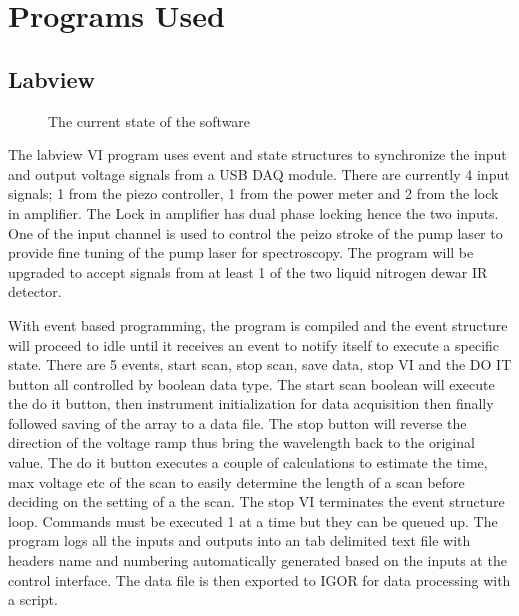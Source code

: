 \documentclass[11pt,a4paper]{book}
\newcommand{\imginput}[1]{} %
\begin{document}
	\section{Programs Used}
		\subsection{Labview}

		\begin{figure} [!ht]
			\centering
			\resizebox{160mm}{!}{\imginput{images/labview-program.pdf_tex}}
			\caption{The current state of the software}
			\label{fig:labview-program}
		\end{figure}

		The labview VI program uses event and state structures to synchronize the input and output voltage signals from a USB DAQ module. There are currently 4 input signals; 1 from the piezo controller, 1 from the power meter and 2 from the lock in amplifier. The Lock in amplifier has dual phase locking hence the two inputs. One of the input channel is used to control the peizo stroke of the pump laser to provide fine tuning of the pump laser for spectroscopy. The program will be upgraded to accept signals from at least 1 of the two liquid nitrogen dewar IR detector. 
		
		With event based programming, the program is compiled and the event structure will proceed to idle until it receives an event to notify itself to execute a specific state. There are 5 events, start scan, stop scan, save data, stop VI and the DO IT button all controlled by boolean data type. The start scan boolean will execute the do it button, then instrument initialization for data acquisition then finally followed saving of the array to a data file. The stop button will reverse the direction of the voltage ramp thus bring the wavelength back to the original value. The do it button executes a couple of calculations to estimate the time, max voltage etc of the scan to easily determine the length of a scan before deciding on the setting of a the scan. The stop VI terminates the event structure loop. Commands must be executed 1 at a time but they can be queued up. The program logs all the inputs and outputs into an tab delimited text file with headers name and numbering automatically generated based on the inputs at the control interface. The data file is then exported to IGOR for data processing with a script. 
\end{document}
